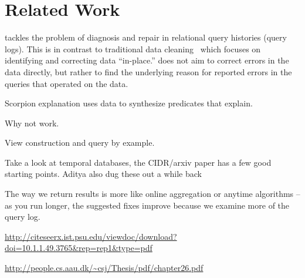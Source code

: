 
\section{Related Work}
\label{s:related}

\sys tackles the problem of diagnosis and repair in relational query
histories (query logs). This is in contrast to traditional data
cleaning~\cite{rahm00} which focuses on identifying and correcting
data ``in-place.'' \sys does not aim to correct errors in the data
directly, but rather to find the underlying reason for reported errors
in the queries that operated on the data.



Scorpion explanation uses data to synthesize predicates that explain.

Why not work.

View construction and query by example.

Take a look at temporal databases, the CIDR/arxiv paper has a few good starting points. Aditya also dug these out a while back


The way we return results is more like online aggregation or anytime algorithms -- 
as you run longer, the suggested fixes improve because we examine more of the query log.

\url{http://citeseerx.ist.psu.edu/viewdoc/download?doi=10.1.1.49.3765&rep=rep1&type=pdf}

\url{http://people.cs.aau.dk/~csj/Thesis/pdf/chapter26.pdf}
